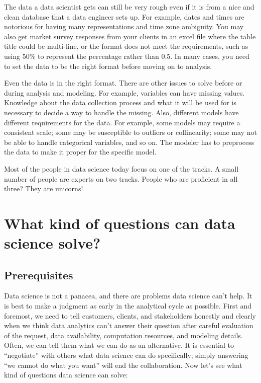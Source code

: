 \documentclass[
  12pt,
]{krantz}
\begin{document}
The data a data scientist gets can still be very rough even if it is from a nice and clean database that a data engineer sets up. For example, dates and times are notorious for having many representations and time zone ambiguity. You may also get market survey responses from your clients in an excel file where the table title could be multi-line, or the format does not meet the requirements, such as using 50\% to represent the percentage rather than 0.5. In many cases, you need to set the data to be the right format before moving on to analysis.

Even the data is in the right format. There are other issues to solve before or during analysis and modeling. For example, variables can have missing values. Knowledge about the data collection process and what it will be used for is necessary to decide a way to handle the missing. Also, different models have different requirements for the data. For example, some models may require a consistent scale; some may be susceptible to outliers or collinearity; some may not be able to handle categorical variables, and so on. The modeler has to preprocess the data to make it proper for the specific model.

Most of the people in data science today focus on one of the tracks. A small number of people are experts on two tracks. People who are proficient in all three? They are unicorns!

\hypertarget{what-kind-of-questions-can-data-science-solve}{%
\section{What kind of questions can data science solve?}\label{what-kind-of-questions-can-data-science-solve}}

\hypertarget{prerequisites}{%
\subsection{Prerequisites}\label{prerequisites}}

Data science is not a panacea, and there are problems data science can't help. It is best to make a judgment as early in the analytical cycle as possible. First and foremost, we need to tell customers, clients, and stakeholders honestly and clearly when we think data analytics can't answer their question after careful evaluation of the request, data availability, computation resources, and modeling details. Often, we can tell them what we can do as an alternative. It is essential to ``negotiate'' with others what data science can do specifically; simply answering ``we cannot do what you want'' will end the collaboration. Now let's see what kind of questions data science can solve:
\end{document}
